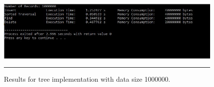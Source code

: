 \begin{figure}[H]
	\centering
	\includegraphics[scale =0.7]{./Figures/Tree1000000.jpg}
	\rule{35em}{0.5pt}
	\caption{Results for tree implementation with data size 1000000.}
	\label{fig:Tree 1000000}
\end{figure}
